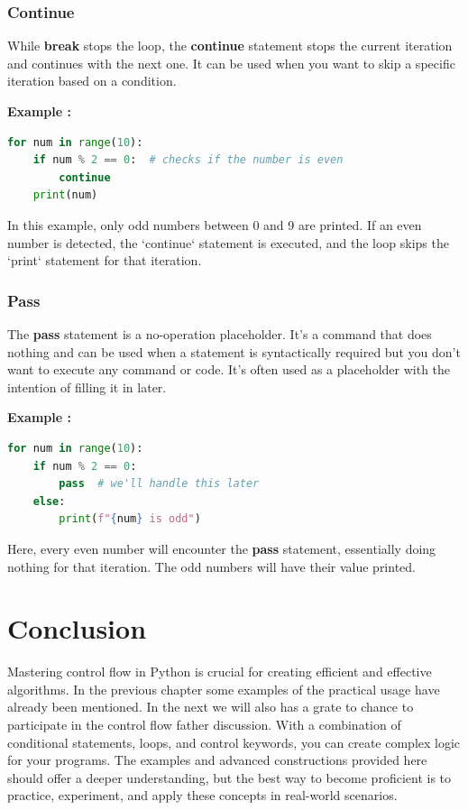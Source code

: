 \documentclass[12pt]{book}
\newtheorem{Example}{Example}[chapter]
\renewenvironment{Example}{\begin{trivlist}\item\relax
\textbf{Example \thesection: }}{\end{trivlist}}
\begin{document}
\subsubsection{Continue}
While \textbf{break} stops the loop, the \textbf{continue} statement stops the current iteration and continues with the next one. It can be used when you want to skip a specific iteration based on a condition.

\begin{Example}
\begin{lstlisting}[language=Python]
for num in range(10):
    if num % 2 == 0:  # checks if the number is even
        continue
    print(num)
\end{lstlisting}
\end{Example}
In this example, only odd numbers between 0 and 9 are printed. If an even number is detected, the `continue` statement is executed, and the loop skips the `print` statement for that iteration.

\subsubsection{Pass}
The \textbf{pass} statement is a no-operation placeholder. It's a command that does nothing and can be used when a statement is syntactically required but you don't want to execute any command or code. It's often used as a placeholder with the intention of filling it in later.

\begin{Example}
\begin{lstlisting}[language=Python]
for num in range(10):
    if num % 2 == 0:
        pass  # we'll handle this later
    else:
        print(f"{num} is odd")
\end{lstlisting}
\end{Example}
Here, every even number will encounter the \textbf{pass} statement, essentially doing nothing for that iteration. The odd numbers will have their value printed.

\section{Conclusion}
Mastering control flow in Python is crucial for creating efficient and effective algorithms. In the previous chapter some examples of the practical usage have already been mentioned. In the next we will also has a grate to chance to participate in the control flow father discussion. With a combination of conditional statements, loops, and control keywords, you can create complex logic for your programs. The examples and advanced constructions provided here should offer a deeper understanding, but the best way to become proficient is to practice, experiment, and apply these concepts in real-world scenarios.
\end{document}
